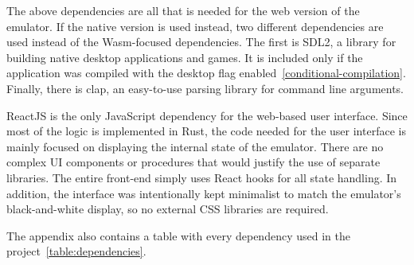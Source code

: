 The above dependencies are all that is needed for the web version of the emulator. If the native version is used instead, two different dependencies are used instead of the Wasm-focused dependencies.
The first is SDL2, a library for building native desktop applications and games.
It is included only if the application was compiled with the desktop flag enabled~\ref{conditional-compilation}.
Finally, there is clap, an easy-to-use parsing library for command line arguments.


ReactJS is the only JavaScript dependency for the web-based user interface.
Since most of the logic is implemented in Rust, the code needed for the user interface is mainly focused on displaying the internal state of the emulator.
There are no complex UI components or procedures that would justify the use of separate libraries.
The entire front-end simply uses React hooks for all state handling.
In addition, the interface was intentionally kept minimalist to match the emulator's black-and-white display, so no external CSS libraries are required.

The appendix also contains a table with every dependency used in the project~\ref{table:dependencies}.
